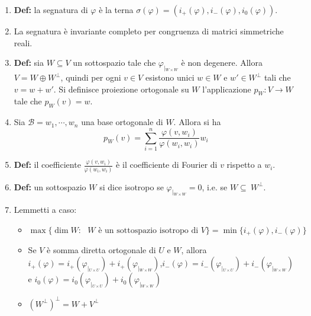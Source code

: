 \documentclass[a4paper,11pt]{article}
\begin{document}
\begin{enumerate}[resume]
\[\begin{array}{c | c | c}
	\end{array}\right)\]
	\item\textbf{Def:} la segnatura di $\varphi$ è la terna $\sigma(\varphi)=\left(i_+(\varphi),i_-(\varphi),i_0(\varphi)\right)$.
	\item La segnatura è invariante completo per congruenza di matrici simmetriche reali.
	\item\textbf{Def:} sia $W\subseteq V$ un sottospazio tale che $\varphi_{\left|_{W\times W}\right.}$ è non degenere. Allora $V=W\oplus W^{\perp}$, quindi per ogni $v\in V$ esistono unici $w\in W$ e $w'\in W^{\perp}$ tali che $v=w+w'$. Si definisce proiezione ortogonale su $W$ l'applicazione $p_W\colon V\to W$ tale che $p_W(v)=w$.
	\item Sia $\mathcal{B}={w_1,\cdots,w_n}$ una base ortogonale di $W$. Allora si ha
	\[p_W(v)=\sum_{i=1}^{n}\frac{\varphi(v,w_i)}{\varphi(w_i,w_i)}w_i\]
	\item\textbf{Def:} il coefficiente $\frac{\varphi(v,w_i)}{\varphi(w_i,w_i)}$ è il coefficiente di Fourier di $v$ rispetto a $w_i$.
	\item\textbf{Def:} un sottospazio $W$ si dice isotropo se $\varphi_{\left|_{W\times W}\right.}=0$, i.e. se $W\subseteq ~W^{\perp}$.
	\item Lemmetti a caso:
	\begin{itemize}
		\item $\max\{\dim W:\textrm{ $W$ è un sottospazio isotropo di $V$}\}=\min\{i_+(\varphi),i_-(\varphi)\}$
		\item Se $V$ è somma diretta ortogonale di $U$ e $W$, allora $i_+(\varphi)=i_+(\varphi_{\left|_{U\times U}\right.})+i_+(\varphi_{\left|_{W\times W}\right.})$,$i_-(\varphi)=i_-(\varphi_{\left|_{U\times U}\right.})+i_-(\varphi_{\left|_{W\times W}\right.})$ e $i_0(\varphi)=i_0(\varphi_{\left|_{U\times U}\right.})+i_0(\varphi_{\left|_{W\times W}\right.})$
		\item $(W^\perp)^\perp=W+V^\perp$
	\end{itemize}
\end{enumerate}
\end{document}
